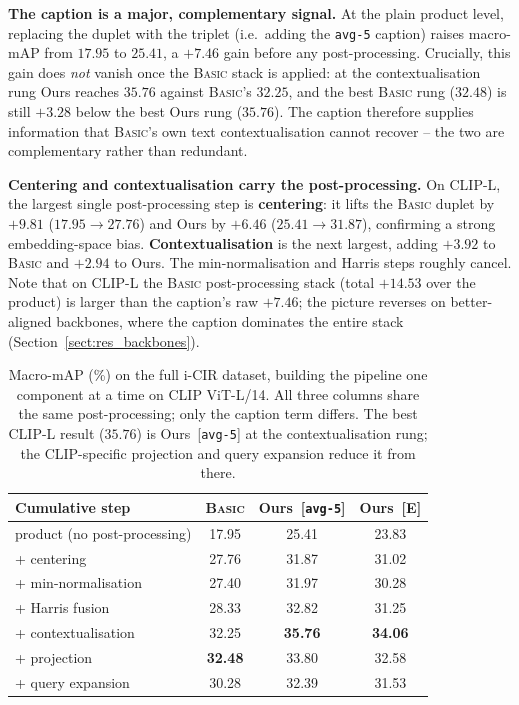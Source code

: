 \textbf{The caption is a major, complementary signal.} At the plain product
level, replacing the duplet with the triplet (i.e.\ adding the \texttt{avg-5}
caption) raises macro-mAP from $17.95$ to $25.41$, a $+7.46$ gain before any
post-processing. Crucially, this gain does \emph{not} vanish once the
\textsc{Basic} stack is applied: at the contextualisation rung Ours reaches
$35.76$ against \textsc{Basic}'s $32.25$, and the best \textsc{Basic} rung
($32.48$) is still $+3.28$ below the best Ours rung ($35.76$). The caption
therefore supplies information that \textsc{Basic}'s own text contextualisation
cannot recover -- the two are complementary rather than redundant.

\textbf{Centering and contextualisation carry the post-processing.} On CLIP-L,
the largest single post-processing step is \textbf{centering}: it lifts the
\textsc{Basic} duplet by $+9.81$ ($17.95\!\to\!27.76$) and Ours by $+6.46$
($25.41\!\to\!31.87$), confirming a strong embedding-space bias.
\textbf{Contextualisation} is the next largest, adding $+3.92$ to \textsc{Basic}
and $+2.94$ to Ours. The min-normalisation and Harris steps roughly cancel. Note
that on CLIP-L the \textsc{Basic} post-processing stack (total $+14.53$ over the
product) is larger than the caption's raw $+7.46$; the picture reverses on
better-aligned backbones, where the caption dominates the entire stack
(Section~\ref{sect:res_backbones}).

\begin{table}[h!]
\centering
\begin{tabular}{l c c c}
\toprule
Cumulative step & \textsc{Basic} & Ours~[\texttt{avg-5}] & Ours~[\textsc{E}] \\ \midrule
product (no post-processing)   & 17.95 & 25.41          & 23.83 \\
\quad + centering              & 27.76 & 31.87          & 31.02 \\
\quad + min-normalisation      & 27.40 & 31.97          & 30.28 \\
\quad + Harris fusion          & 28.33 & 32.82          & 31.25 \\
\quad + contextualisation      & 32.25 & \cellcolor{gray!20}\textbf{35.76} & \cellcolor{gray!20}\textbf{34.06} \\
\quad + projection             & \cellcolor{gray!20}\textbf{32.48} & 33.80 & 32.58 \\
\quad + query expansion        & 30.28 & 32.39 & 31.53 \\
\bottomrule
\end{tabular}
\caption[Component ladder on CLIP-L (full i-CIR).]{Macro-mAP (\%) on the full
i-CIR dataset, building the pipeline one component at a time on CLIP ViT-L/14.
All three columns share the same post-processing; only the caption term differs.
The best CLIP-L result ($35.76$) is Ours~[\texttt{avg-5}] at
the contextualisation rung; the CLIP-specific projection and query expansion
reduce it from there.\label{tab:res_ladder}}
\end{table}

